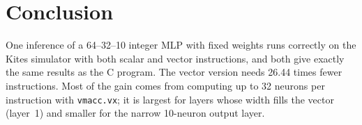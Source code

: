 \documentclass[11pt,a4paper]{article}
\newcommand{\code}[1]{\texttt{#1}}
\begin{document}
\section{Conclusion}

One inference of a 64--32--10 integer MLP with fixed weights runs correctly on the Kites simulator
with both scalar and vector instructions, and both give exactly the same results as the C program.
The vector version needs 26.44 times fewer instructions. Most of the gain comes from computing
up to 32 neurons per instruction with \code{vmacc.vx}; it is largest for layers whose width fills
the vector (layer~1) and smaller for the narrow 10-neuron output layer.
\end{document}
